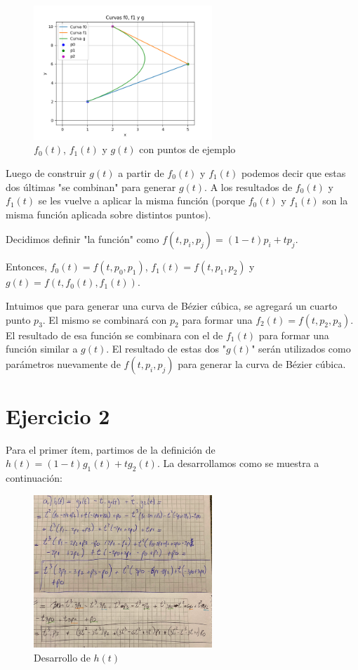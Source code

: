 \documentclass{article}
\begin{document}
\begin{figure}[H]
    \centering
    \includegraphics[width=0.6\textwidth]{imagenes/graf_ej1.png}
    \caption{$f_0(t)$, $f_1(t)$ y $g(t)$ con puntos de ejemplo}
    \label{fig:ejemplo}
\end{figure}

Luego de construir $g(t)$ a partir de $f_0(t)$ y $f_1(t)$ podemos decir que estas dos últimas "se combinan" para generar  $g(t)$. A los resultados de $f_0(t)$ y $f_1(t)$ se les vuelve a aplicar la misma función (porque $f_0(t)$ y $f_1(t)$ son la misma función aplicada sobre distintos puntos).

Decidimos definir "la función" como $f(t, p_i, p_j) = (1-t) p_i + t p_j$.

Entonces, $f_0(t) = f(t, p_0, p_1)$, $f_1(t) = f(t, p_1, p_2)$ y $g(t) = f(t, f_0(t), f_1(t))$.

Intuimos que para generar una curva de Bézier cúbica, se agregará un cuarto punto $p_3$. El mismo se combinará con $p_2$ para formar una $f_2(t) = f(t, p_2, p_3)$. El resultado de esa función se combinara con el de $f_1(t)$ para formar una función similar a $g(t)$. El resultado de estas dos "$g(t)$" serán utilizados como parámetros nuevamente de $f(t, p_i, p_j)$ para generar la curva de Bézier cúbica.

\section*{Ejercicio 2}

Para el primer ítem, partimos de la definición de $h(t) = (1 - t)g_1(t) + t g_2(t)$. La desarrollamos como se muestra a continuación:

\begin{figure}[H]
    \centering
    \includegraphics[width=0.6\textwidth]{imagenes/2a.png}
    \caption{Desarrollo de $h(t)$}
    \label{fig:ejemplo}
\end{figure}
\end{document}
